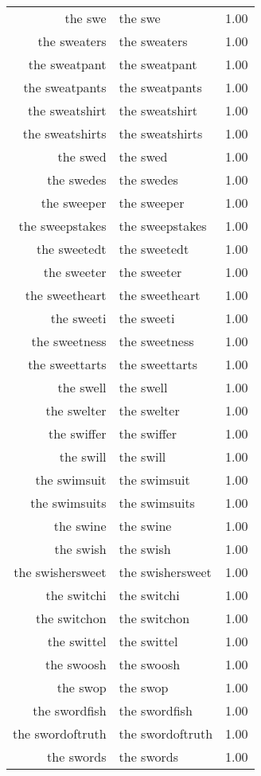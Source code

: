 \begin{table}[ht]
\begin{tabular}{rlr}
  the swe & the swe & 1.00 \\ 
  the sweaters & the sweaters & 1.00 \\ 
  the sweatpant & the sweatpant & 1.00 \\ 
  the sweatpants & the sweatpants & 1.00 \\ 
  the sweatshirt & the sweatshirt & 1.00 \\ 
  the sweatshirts & the sweatshirts & 1.00 \\ 
  the swed & the swed & 1.00 \\ 
  the swedes & the swedes & 1.00 \\ 
  the sweeper & the sweeper & 1.00 \\ 
  the sweepstakes & the sweepstakes & 1.00 \\ 
  the sweetedt & the sweetedt & 1.00 \\ 
  the sweeter & the sweeter & 1.00 \\ 
  the sweetheart & the sweetheart & 1.00 \\ 
  the sweeti & the sweeti & 1.00 \\ 
  the sweetness & the sweetness & 1.00 \\ 
  the sweettarts & the sweettarts & 1.00 \\ 
  the swell & the swell & 1.00 \\ 
  the swelter & the swelter & 1.00 \\ 
  the swiffer & the swiffer & 1.00 \\ 
  the swill & the swill & 1.00 \\ 
  the swimsuit & the swimsuit & 1.00 \\ 
  the swimsuits & the swimsuits & 1.00 \\ 
  the swine & the swine & 1.00 \\ 
  the swish & the swish & 1.00 \\ 
  the swishersweet & the swishersweet & 1.00 \\ 
  the switchi & the switchi & 1.00 \\ 
  the switchon & the switchon & 1.00 \\ 
  the swittel & the swittel & 1.00 \\ 
  the swoosh & the swoosh & 1.00 \\ 
  the swop & the swop & 1.00 \\ 
  the swordfish & the swordfish & 1.00 \\ 
  the swordoftruth & the swordoftruth & 1.00 \\ 
  the swords & the swords & 1.00 \\ 

\end{tabular}
\end{table}
